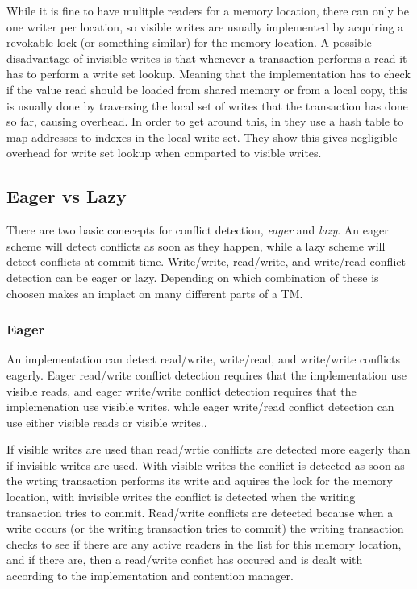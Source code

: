While it is fine to have mulitple readers for a memory location, there can only be one writer per location, so visible writes are usually implemented by acquiring a revokable lock (or something similar) for the memory location.
A possible disadvantage of invisible writes is that whenever a transaction performs a read it has to perform a write set lookup.
Meaning that the implementation has to check if the value read should be loaded from shared memory or from a local copy, this is usually done by traversing the local set of writes that the transaction has done so far, causing overhead.
In order to get around this, in \cite{1504199} they use a hash table to map addresses to indexes in the local write set.
They show this gives negligible overhead for write set lookup when comparted to visible writes.

\subsection{Eager vs Lazy}
There are two basic conecepts for conflict detection, \emph{eager} and \emph{lazy}.  An eager scheme will detect conflicts as soon as they happen, while a lazy scheme will detect conflicts at commit time.
Write/write, read/write, and write/read conflict detection can be eager or lazy.  Depending on which combination of these is choosen makes an implact on many different parts of a TM.

\subsubsection{Eager}
An implementation can detect read/write, write/read, and write/write conflicts eagerly.
Eager read/write conflict detection requires that the implementation use visible reads, and eager write/write conflict detection requires that the implemenation use visible writes, while eager write/read conflict detection can use either visible reads or visible writes..

If visible writes are used than read/wrtie conflicts are detected more eagerly than if invisible writes are used.
With visible writes the conflict is detected as soon as the wrting transaction performs its write and aquires the lock for the memory location, with invisible writes the conflict is detected when the writing transaction tries to commit.
Read/write conflicts are detected because when a write occurs (or the writing transaction tries to commit) the writing transaction checks to see if there are any active readers in the list for this memory location, and if there are, then a read/write confict has occured and is dealt with according to the implementation and contention manager.

